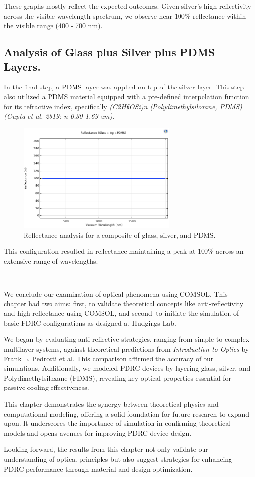 These graphs mostly reflect the expected outcomes. Given silver's high reflectivity across the visible wavelength spectrum, we observe near 100\% reflectance within the visible range (400 - 700 nm).

\subsection{Analysis of Glass plus Silver plus PDMS Layers.}
In the final step, a PDMS layer was applied on top of the silver layer. This step also utilized a PDMS material equipped with a pre-defined interpolation function for its refractive index, specifically \emph{(C2H6OSi)n (Polydimethylsiloxane, PDMS) (Gupta et al. 2019: n 0.30-1.69 um)}.

\begin{figure}[H]
  \centering
  \includegraphics[width=0.7\textwidth]{Chapters/Figures/Chapter 4 Figures/Reflectance Results (Glass + Ag + PDMS).png}
  \caption{Reflectance analysis for a composite of glass, silver, and PDMS.}
  \label{fig:Reflectance analysis for glass, silver, and PDMS}
\end{figure}

This configuration resulted in reflectance maintaining a peak at 100\% across an extensive range of wavelengths.


---


We conclude our examination of optical phenomena using COMSOL. This chapter had two aims: first, to validate theoretical concepts like anti-reflectivity and high reflectance using COMSOL, and second, to initiate the simulation of basic PDRC configurations as designed at Hudgings Lab.

We began by evaluating anti-reflective strategies, ranging from simple to complex multilayer systems, against theoretical predictions from \emph{Introduction to Optics} by Frank L. Pedrotti et al. This comparison affirmed the accuracy of our simulations. Additionally, we modeled PDRC devices by layering glass, silver, and Polydimethylsiloxane (PDMS), revealing key optical properties essential for passive cooling effectiveness.

This chapter demonstrates the synergy between theoretical physics and computational modeling, offering a solid foundation for future research to expand upon. It underscores the importance of simulation in confirming theoretical models and opens avenues for improving PDRC device design.

Looking forward, the results from this chapter not only validate our understanding of optical principles but also suggest strategies for enhancing PDRC performance through material and design optimization.